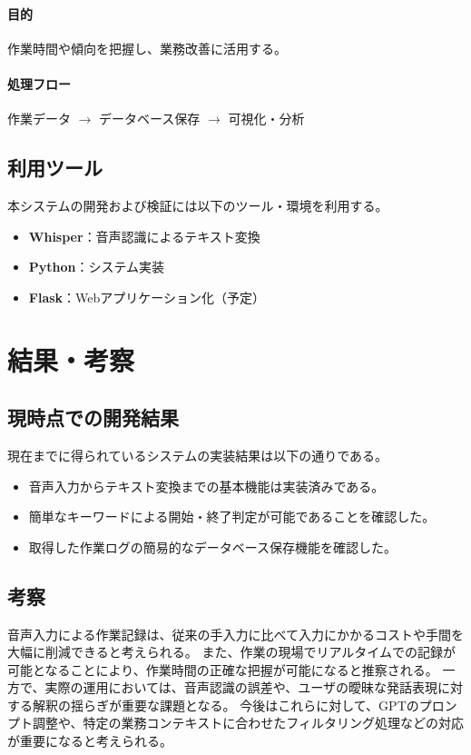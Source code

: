 \documentclass[a4paper,12pt,ja=standard,lualatex]{bxjsarticle}
\begin{document}
\paragraph{目的}
作業時間や傾向を把握し、業務改善に活用する。
\paragraph{処理フロー}
作業データ $\rightarrow$ データベース保存 $\rightarrow$ 可視化・分析

\subsection{利用ツール}
本システムの開発および検証には以下のツール・環境を利用する。
\begin{itemize}
    \item \textbf{Whisper}：音声認識によるテキスト変換
    \item \textbf{Python}：システム実装
    \item \textbf{Flask}：Webアプリケーション化（予定）
\end{itemize}

\newpage

\section{結果・考察}\label{sec4}

\subsection{現時点での開発結果}
現在までに得られているシステムの実装結果は以下の通りである。
\begin{itemize}
    \item 音声入力からテキスト変換までの基本機能は実装済みである。
    \item 簡単なキーワードによる開始・終了判定が可能であることを確認した。
    \item 取得した作業ログの簡易的なデータベース保存機能を確認した。
\end{itemize}

\subsection{考察}
音声入力による作業記録は、従来の手入力に比べて入力にかかるコストや手間を大幅に削減できると考えられる。
また、作業の現場でリアルタイムでの記録が可能となることにより、作業時間の正確な把握が可能になると推察される。
一方で、実際の運用においては、音声認識の誤差や、ユーザの曖昧な発話表現に対する解釈の揺らぎが重要な課題となる。
今後はこれらに対して、GPTのプロンプト調整や、特定の業務コンテキストに合わせたフィルタリング処理などの対応が重要になると考えられる。
\end{document}
